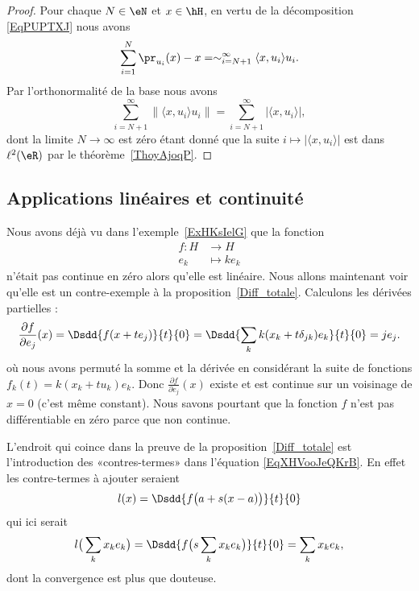 \begin{proof}
	Pour chaque \( N\in \eN\) et \( x\in\hH\), en vertu de la décomposition \eqref{EqPUPTXJ} nous avons
	\begin{equation}
		\sum_{i=1}^N\pr_{u_i}(x)-x=\sim_{i=N+1}^{\infty}\langle x, u_i\rangle u_i.
	\end{equation}
	Par l'orthonormalité de la base nous avons
	\begin{equation}
		\sum_{i=N+1}^{\infty}\| \langle x, u_i\rangle u_i \|=\sum_{i=N+1}^{\infty}| \langle x, u_i\rangle  |,
	\end{equation}
	dont la limite \( N\to \infty\) est zéro étant donné que la suite \( i\mapsto| \langle x, u_i\rangle  |\) est dans \( \ell^2(\eR)\) par le théorème~\ref{ThoyAjoqP}.
\end{proof}

\subsection{Applications linéaires et continuité}

Nous avons déjà vu dans l'exemple~\ref{ExHKsIelG} que la fonction
\begin{equation}    \label{EqCJVooJOuXdN}
	\begin{aligned}
		f\colon H & \to H        \\
		e_k       & \mapsto ke_k
	\end{aligned}
\end{equation}
n'était pas continue en zéro alors qu'elle est linéaire. Nous allons maintenant voir qu'elle est un contre-exemple à la proposition~\ref{Diff_totale}. Calculons les dérivées partielles :
\begin{equation}
	\frac{ \partial f }{ \partial e_j }(x)=\Dsdd{ f(x+te_j) }{t}{0}=\Dsdd{ \sum_k k(x_k+t\delta_{jk})e_k }{t}{0}=je_j.
\end{equation}
où nous avons permuté la somme et la dérivée en considérant la suite de fonctions \( f_k(t)=k(x_k+tu_k)e_k\). Donc \( \frac{ \partial f }{ \partial e_j }(x)\) existe et est continue sur un voisinage de \( x=0\) (c'est même constant). Nous savons pourtant que la fonction \( f\) n'est pas différentiable en zéro parce que non continue.

L'endroit qui coince dans la preuve de la proposition~\ref{Diff_totale} est l'introduction des «contres-termes» dans l'équation \eqref{EqXHVooJeQKrB}. En effet les contre-termes à ajouter seraient
\begin{equation}
	l(x)=\Dsdd{ f\big( a+s(x-a) \big) }{t}{0}
\end{equation}
qui ici serait
\begin{equation}
	l\big( \sum_kx_ke_k \big)=\Dsdd{ f\big( s\sum_kx_ke_k \big) }{t}{0}=\sum_kx_ke_k,
\end{equation}
dont la convergence est plus que douteuse.

